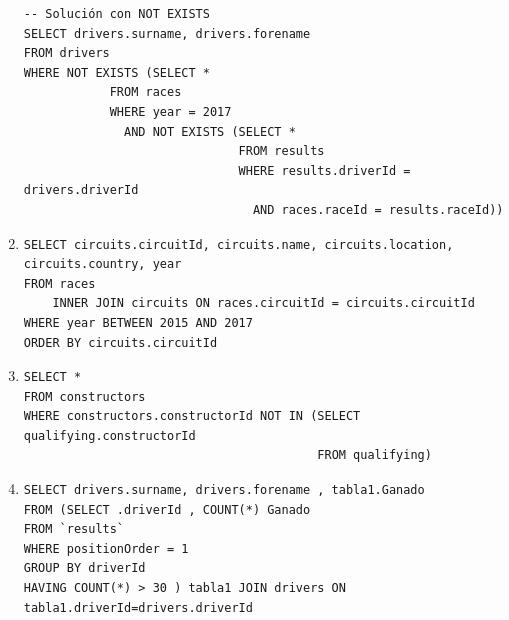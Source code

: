 \documentclass[a4paper]{article}
\begin{document}
\begin{enumerate}
\begin{verbatim}
-- Solución con NOT EXISTS                                     
SELECT drivers.surname, drivers.forename
FROM drivers
WHERE NOT EXISTS (SELECT *
            FROM races
            WHERE year = 2017 
              AND NOT EXISTS (SELECT *
                              FROM results
                              WHERE results.driverId = drivers.driverId 
                                AND races.raceId = results.raceId))
    \end{verbatim}
    
    \item %
    \begin{verbatim}  
SELECT circuits.circuitId, circuits.name, circuits.location, circuits.country, year
FROM races 
    INNER JOIN circuits ON races.circuitId = circuits.circuitId
WHERE year BETWEEN 2015 AND 2017
ORDER BY circuits.circuitId
    \end{verbatim}
    
    \item %
    \begin{verbatim}           
SELECT *
FROM constructors
WHERE constructors.constructorId NOT IN (SELECT qualifying.constructorId 
                                         FROM qualifying)  
    \end{verbatim}            
    
    \item %
    \begin{verbatim}  
SELECT drivers.surname, drivers.forename , tabla1.Ganado
FROM (SELECT .driverId , COUNT(*) Ganado
FROM `results`
WHERE positionOrder = 1
GROUP BY driverId
HAVING COUNT(*) > 30 ) tabla1 JOIN drivers ON tabla1.driverId=drivers.driverId 
    \end{verbatim}    
    

\end{enumerate}
\end{document}
